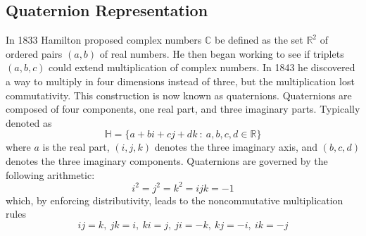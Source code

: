 \documentclass[14pt,a4paper]{article}
\begin{document}
\subsection{Quaternion Representation}
In 1833 Hamilton proposed complex numbers $\mathbb{C}$ be defined as the set $\mathbb{R}^2$ of ordered pairs $(a, b)$ of real numbers.
He then began working to see if triplets $(a,b,c)$ could extend multiplication of complex numbers.
In 1843 he discovered a way to multiply in four dimensions instead of three, but the multiplication lost commutativity.
This construction is now known as quaternions.
Quaternions are composed of four components, one real part, and three imaginary parts.
Typically denoted as
\begin{equation}
\mathbb{H} = \{a + b\textit{i} + c\textit{j} + d\textit{k}~:~a,b,c,d \in \mathbb{R}\}
\label{eq:quaternion1}
\end{equation}
where $a$ is the real part, $(i,j,k)$ denotes the three imaginary axis, and $(b,c,d)$ denotes the three imaginary components.
Quaternions are governed by the following arithmetic:
\begin{equation}
i^2=j^2=k^2=ijk=-1
\label{eq:quarternion2}
\end{equation}
which, by enforcing distributivity, leads to the noncommutative multiplication rules
\begin{equation}
ij=k,~jk=i,~ki=j,~ji=-k,~kj=-i,~ik=-j
\label{eq:quarternion3}
\end{equation}
\end{document}
